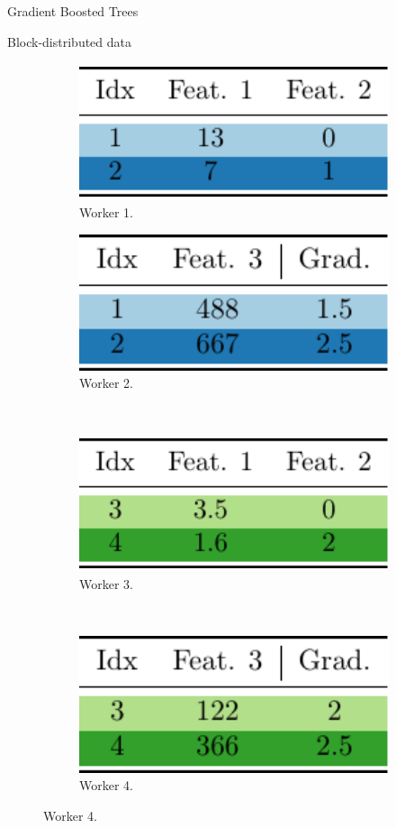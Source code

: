 \documentclass[final]{beamer}
\newlength{\onecolwid}
\begin{document}
\begin{frame}[t]
\begin{columns}[t]
\begin{column}{\onecolwid}
\begin{block}{Gradient Boosted Trees}
	\end{block}

\begin{block}{Block-distributed data}
	\begin{figure}
		\centering
		\begin{subfigure}[t]{0.45\onecolwid}
			\centering
			\includegraphics[height=4cm]{w1}
			\caption{Worker 1.}
		\end{subfigure}
		\quad
		\begin{subfigure}[t]{0.45\onecolwid}
			\centering
			\includegraphics[height=4cm]{w2}
			\caption{Worker 2.}
		\end{subfigure}
		\\
		\vspace{15pt}
		\begin{subfigure}[t]{0.45\onecolwid}
			\centering
			\includegraphics[height=4cm]{w3}
			\caption{Worker 3.}
		\end{subfigure}
		~
		\begin{subfigure}[t]{0.45\onecolwid}
			\centering
			\includegraphics[height=4cm]{w4}
			\caption{Worker 4.}
		\end{subfigure}
		

\end{figure}
\end{block}
\end{column}
\end{columns}
\end{frame}
\end{document}
